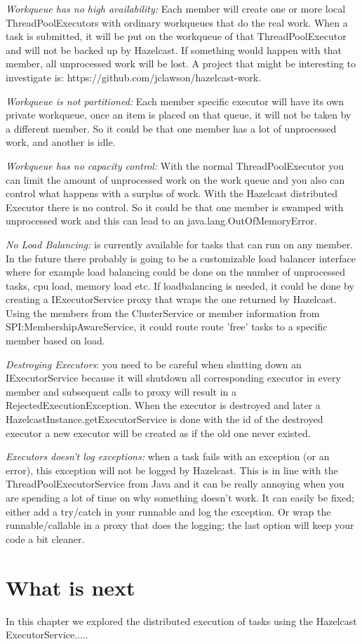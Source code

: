 \emph{Workqueue has no high availability:} Each member will create one or more local ThreadPoolExecutors with ordinary workqueues that do the real work. When a task is submitted, it will be put on the workqueue of that ThreadPoolExecutor and will not be backed up by Hazelcast. If something would happen with that member, all unprocessed work will be lost. A project that might be interesting to investigate is: https://github.com/jclawson/hazelcast-work.

\emph{Workqueue is not partitioned:} Each member specific executor will have its own private workqueue, once an item is placed on that queue, it will not be taken by a different member. So it could be that one member has a lot of unprocessed work, and another is idle.

\emph{Workqueue has no capacity control:} With the normal ThreadPoolExecutor you can limit the amount of unprocessed work on the work queue and you also can control what happens with a surplus of work. With the Hazelcast distributed Executor there is no control. So it could be that one member is swamped with unprocessed work and this can lead to an java.lang.OutOfMemoryError. 

\emph{No Load Balancing:} is currently available for tasks that can run on any member. In the future there probably is going to be a customizable load balancer interface where for example load balancing could be done on the number of unprocessed tasks, cpu load, memory load etc. If loadbalancing is needed, it could be done by creating a IExecutorService proxy that wraps the one returned by Hazelcast. Using the members from the ClusterService or  member information from SPI:MembershipAwareService, it could route route 'free' tasks to a specific member based on load.

\emph{Destroying Executors}: you need to be careful when shutting down an IExecutorService because it will shutdown all corresponding executor in every member and subsequent calls to proxy will result in a RejectedExecutionException. When the executor is destroyed and later a HazelcastInstance.getExecutorService is done with the id of the destroyed executor a new executor will be created as if the old one never existed.

\emph{Executors doesn't log exceptions:} when a task fails with an exception (or an error), this exception will not be logged by Hazelcast. This is in line with the ThreadPoolExecutorService from Java and it can be really annoying when you are spending a lot of time on why something doesn't work. It can easily be fixed; either add a try/catch in your runnable and log the exception. Or wrap the runnable/callable in a proxy that does the logging; the last option will keep your code a bit cleaner. 

\section{What is next}
In this chapter we explored the distributed execution of tasks using the Hazelcast ExecutorService.....